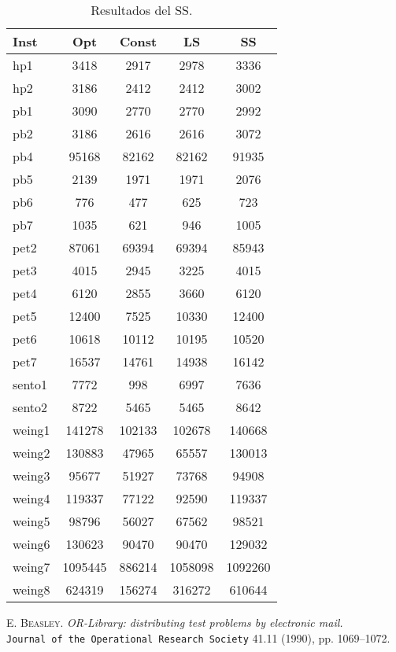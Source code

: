 \documentclass[12pt,a4paper,twocolumn]{article}
\begin{document}
\begin{center}
\begin{table}
\begin{tabular}{lcccc}
\toprule
{Inst} & {Opt} & {Const} & {LS} & {SS} \\
\midrule
hp1 & 3418 & 2917  &2978 & 3336 \\
hp2 & 3186 & 2412  &2412 & 3002 \\
pb1 & 3090 & 2770  &2770 & 2992 \\
pb2 & 3186 & 2616  &2616 & 3072 \\
pb4 & 95168 & 82162  &82162 & 91935 \\
pb5 & 2139 & 1971  &1971 & 2076 \\
pb6 & 776 & 477  &625 & 723 \\
pb7 & 1035 & 621  &946 & 1005 \\
pet2 & 87061 & 69394  &69394 & 85943 \\
\color{red} pet3 & \color{red} 4015 & 2945  &3225 & \color{red} 4015 \\
\color{red} pet4 & \color{red} 6120 & 2855  &3660 & \color{red} 6120 \\
\color{red} pet5 & \color{red} 12400 & 7525  &10330 & \color{red} 12400 \\
pet6 & 10618 & 10112  &10195 & 10520 \\
pet7 & 16537 & 14761  &14938 & 16142\\
sento1 & 7772 & 998  &6997 & 7636\\
sento2 & 8722 & 5465  &5465 & 8642\\
weing1 & 141278 & 102133  &102678 & 140668 \\
weing2 & 130883 & 47965  &65557 & 130013 \\
weing3 & 95677 & 51927  &73768 & 94908 \\
\color{red} weing4 & \color{red} 119337 & 77122  &92590 & \color{red} 119337 \\
weing5 & 98796 & 56027  &67562 & 98521 \\
weing6 & 130623 & 90470  &90470 & 129032 \\
weing7 & 1095445 & 886214  &1058098 & 1092260 \\
weing8 & 624319 & 156274  &316272 & 610644 \\
\bottomrule
\end{tabular}
\caption{Resultados del SS.}
\label{resultados}
\end{table}
\end{center}

\begin{thebibliography}{X}
 \textsc{E. Beasley.} \textit{OR-Library: distributing test problems by electronic mail.} \\
\texttt{Journal of the Operational Research Society} 41.11 (1990), pp. 1069–1072.
\end{thebibliography}
\end{document}
